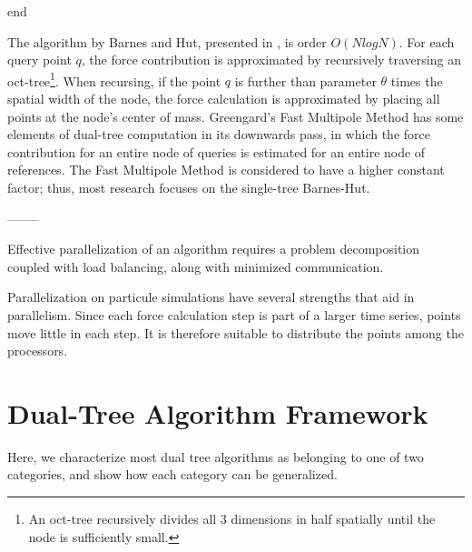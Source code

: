 \documentclass[times, 10pt,twocolumn]{article}
\begin{document}
end

The algorithm by Barnes and Hut, presented in \cite{barneshut}, is order $O(N log N)$.
For each query point $q$, the force contribution is approximated by recursively traversing an oct-tree\footnote{An oct-tree recursively divides all 3 dimensions in half spatially until the node is sufficiently small.}.
When recursing, if the point $q$ is further than parameter $\theta$ times the spatial width of the node, the force calculation is approximated by placing all points at the node's center of mass.
Greengard's Fast Multipole Method \cite{greengard_fmm} has some elements of dual-tree computation in its downwards pass, in which the force contribution for an entire node of queries is estimated for an entire node of references.
The Fast Multipole Method is considered to have a higher constant factor; thus, most research focuses on the single-tree Barnes-Hut\cite{fmm_slower}.

--------

Effective parallelization of an algorithm requires a problem decomposition coupled with load balancing, along with minimized communication.

Parallelization on particule simulations have several strengths that aid in parallelism.
Since each force calculation step is part of a larger time series, points move little in each step.
It is therefore suitable to distribute the points among the processors.


\section{Dual-Tree Algorithm Framework}

Here, we characterize most dual tree algorithms as belonging to one of two categories, and show how each category can be generalized.
\end{document}
